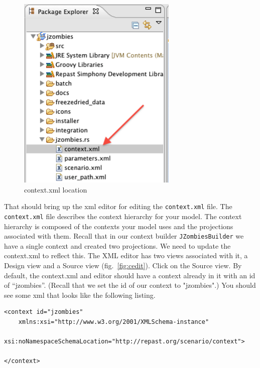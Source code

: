 \documentclass[11pt]{amsart}
\begin{document}
\begin{figure}[h]
\begin{center}
\vspace{.2in}
\centerline {
\includegraphics[width=3in]{GettingStartedImages/context_xml.png}
}
\caption{context.xml location}
\label{fig:context}
\end{center}
\end{figure}

That should bring up the xml editor for editing the \texttt{context.xml} file. The \texttt{context.xml} file describes the context hierarchy for your model. The context hierarchy is composed of the contexts your model uses and the projections associated with them. Recall that in our context builder \texttt{JZombiesBuilder} we have a single context and created two projections. We need to update the context.xml to reflect this. The XML editor has two views associated with it, a Design view and a Source view (fig.~\ref{fig:cedit}). Click on the Source view. By default, the context.xml and editor should have a context already in it with an id of ``jzombies''. (Recall that we set the id of our context to "jzombies".) You should see some xml that looks like the following listing.

\noindent\begin{minipage}[h]{\textwidth}
\vspace{.2in}
\lstset{language=java,caption=JZombiesBuilder.build Complete }
\begin{lstlisting}
<context id="jzombies"
	xmlns:xsi="http://www.w3.org/2001/XMLSchema-instance"
	xsi:noNamespaceSchemaLocation="http://repast.org/scenario/context">
	
</context>

\end{lstlisting}
\vspace{.2in}
\end{minipage}
\end{document}
